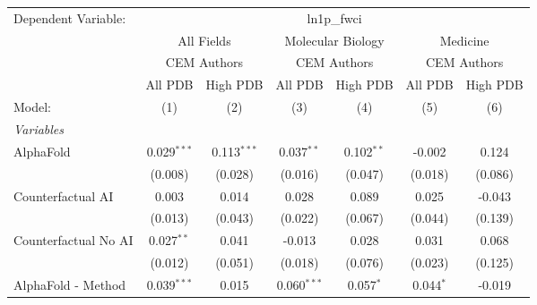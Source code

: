 \begingroup
\centering
\begin{tabular}{lcccccc}
   \tabularnewline \midrule \midrule
   Dependent Variable: & \multicolumn{6}{c}{ln1p\_fwci}\\
 & \multicolumn{2}{c}{All Fields} & \multicolumn{2}{c}{Molecular Biology} & \multicolumn{2}{c}{Medicine} \\
\cmidrule(lr){2-3} \cmidrule(lr){4-5} \cmidrule(lr){6-7}
 & \multicolumn{2}{c}{CEM Authors} & \multicolumn{2}{c}{CEM Authors} & \multicolumn{2}{c}{CEM Authors} \\
\cmidrule(lr){2-3} \cmidrule(lr){4-5} \cmidrule(lr){6-7}
 & \multicolumn{1}{c}{All PDB} & \multicolumn{1}{c}{High PDB} & \multicolumn{1}{c}{All PDB} & \multicolumn{1}{c}{High PDB} & \multicolumn{1}{c}{All PDB} & \multicolumn{1}{c}{High PDB} \\
\cmidrule(lr){2-2} \cmidrule(lr){3-3} \cmidrule(lr){4-4} \cmidrule(lr){5-5} \cmidrule(lr){6-6} \cmidrule(lr){7-7}
   Model:                                                     & (1)           & (2)           & (3)           & (4)          & (5)           & (6)\\  
   \midrule
   \emph{Variables}\\
   AlphaFold                                                  & 0.029$^{***}$ & 0.113$^{***}$ & 0.037$^{**}$  & 0.102$^{**}$ & -0.002        & 0.124\\   
                                                              & (0.008)       & (0.028)       & (0.016)       & (0.047)      & (0.018)       & (0.086)\\   
   Counterfactual AI                                          & 0.003         & 0.014         & 0.028         & 0.089        & 0.025         & -0.043\\   
                                                              & (0.013)       & (0.043)       & (0.022)       & (0.067)      & (0.044)       & (0.139)\\   
   Counterfactual No AI                                       & 0.027$^{**}$  & 0.041         & -0.013        & 0.028        & 0.031         & 0.068\\   
                                                              & (0.012)       & (0.051)       & (0.018)       & (0.076)      & (0.023)       & (0.125)\\   
   AlphaFold - Method                                         & 0.039$^{***}$ & 0.015         & 0.060$^{***}$ & 0.057$^{*}$  & 0.044$^{*}$   & -0.019\\   

\end{tabular}
